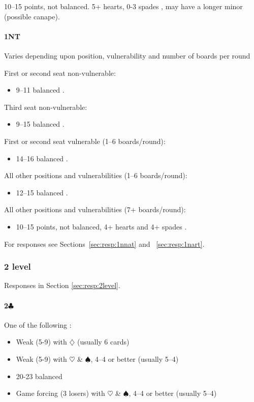 \documentclass[a4paper,14pt]{extarticle}
\begin{document}
10--15 points, not balanced. 5+ hearts, 0-3 spades , may have a longer minor (possible canape).

\paragraph{1NT}

Varies depending upon position, vulnerability and number of boards per round 

First or second seat non-vulnerable:
\begin{itemize}
\item 9--11 balanced .
\end{itemize}

Third seat non-vulnerable:
\begin{itemize}
\item 9--15 balanced .
\end{itemize}

First or second seat vulnerable (1--6 boards/round):
\begin{itemize}
\item 14--16 balanced .
\end{itemize}

All other positions and vulnerabilities (1--6 boards/round):
\begin{itemize}
\item 12--15 balanced .
\end{itemize}

All other positions and vulnerabilities (7+ boards/round):
\begin{itemize}
\item 10--15 points, not balanced, 4+ hearts and 4+ spades .
\end{itemize}

For responses see Sections~\ref{sec:resp:1nnat} and ~\ref{sec:resp:1nart}.

\newpage 

\subsubsection{2 level}
\label{sec:open:2level}

Responses in Section \ref{sec:resp:2level}.

\paragraph{2$\clubsuit$}
One of the following :
\begin{itemize}
\item Weak (5-9) with $\diamondsuit$ (usually 6 cards)
\item Weak (5-9) with $\heartsuit$ \& $\spadesuit$, 4--4 or better (usually 5--4)
\item 20-23 balanced
\item Game forcing (3 losers) with $\heartsuit$ \& $\spadesuit$, 4--4 or better (usually 5--4)
\end{itemize}
\end{document}
